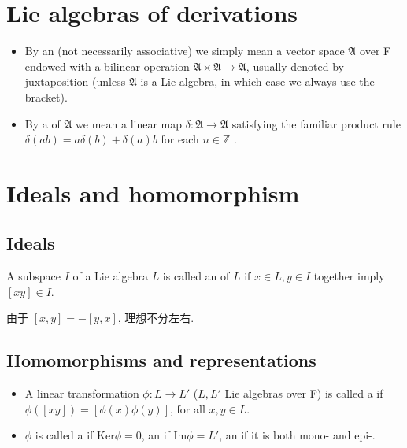\documentclass[../main.tex]{subfiles}
\begin{document}
\section{Lie algebras of derivations}

\begin{definition}{}{}
   \begin{itemize}
    \item   By an  (not necessarily associative) we simply mean a vector space $\mathfrak{A}$ over F endowed with a bilinear operation $\mathfrak{A} \times \mathfrak{A} \to \mathfrak{A}$, usually denoted by juxtaposition (unless $\mathfrak{A}$ is a Lie algebra, in which case we always use the bracket).
    \item  By a  of $\mathfrak{A}$ we mean a linear map $\delta: \mathfrak{A} \to \mathfrak{A}$ satisfying the familiar product rule $\delta(ab) = a\delta(b) + \delta(a)b$ for each \(  n\in \mathbb{Z}   \) . 
   \end{itemize}
   
\end{definition}

\section{Ideals and homomorphism}

\subsection{Ideals}
\begin{definition}{}{}
   A subspace $I$ of a Lie algebra $L$ is called an  of $L$ if $x \in L, y \in I$ together imply $[xy] \in I$.
\end{definition}

\begin{remark}
   由于 \(  \left[ x,y \right]= -\left[ y,x \right]    \), 理想不分左右. 
\end{remark}
\subsection{Homomorphisms and representations}
\begin{definition}{}{}
 \begin{itemize}
   \item   A linear transformation $\phi: L \to L'$ ($L, L'$ Lie algebras over F) is called a  if $\phi([xy]) = [\phi(x)\phi(y)]$, for all $x, y \in L$.
   \item $\phi$ is called a  if $\mathrm{Ker} \phi = 0$, an  if $\mathrm{Im} \phi = L'$, an  if it is both mono- and epi-. 
   
 \end{itemize}
 
\end{definition}
\end{document}
